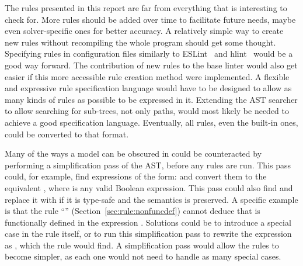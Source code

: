 \documentclass[a4paper,12pt]{article}
\newcommand{\ruleref}[1]{``\nameref{sec:rule:#1}'' (Section~\ref{sec:rule:#1})}
\begin{document}
The rules presented in this report are far from everything that is interesting to check
for. More rules should be added over time to facilitate future needs, maybe even solver-specific ones for better accuracy. A relatively simple way to create new rules without
recompiling the whole program should get some thought. Specifying rules in configuration
files similarly to ESLint~\cite{ESLint} and hlint~\cite{hlint} would be a good way forward. The contribution of
new rules to the base linter would also get easier if this more accessible rule creation
method were implemented. A flexible and expressive rule specification language would have to
be designed to allow as many kinds of rules as possible to be expressed in it.
Extending the AST searcher to allow searching for sub-trees, not only paths, would most
likely be needed to achieve a good specification language. Eventually, all rules,
even the built-in ones, could be converted to that format.

Many of the ways a model can be obscured in could be counteracted by performing a
simplification pass of the AST, before any rules are run. This pass could, for example, find
expressions of the form:  and convert them to the equivalent , where
 is any valid Boolean expression. This pass could also find \mi{[a]} and replace it with 
if it is type-safe and the semantics is preserved. A specific example is that the rule
\ruleref{nonfuncdef} cannot deduce that  is functionally defined in the expression
\mi{[a] = [b+1]}. Solutions could be to introduce a special case in the rule itself, or to
run this simplification pass to rewrite the expression as , which the rule
would find. A simplification pass would allow the rules to become simpler, as each one
would not need to handle as many special cases.


%


\newpage

\end{document}
